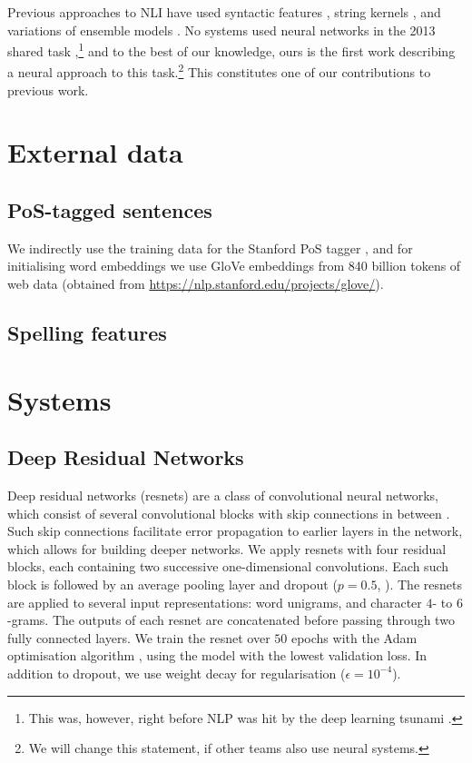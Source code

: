 \documentclass[11pt,letterpaper]{article}
\begin{document}
Previous approaches to NLI have used syntactic features \citep{bykh:2014}, string kernels \citep{ionescu:2014}, and variations of ensemble models \citep{malmasi:2017:nlisg,nli2013}.
No systems used neural networks in the 2013 shared task \citep{nli2013},\footnote{This was, however, right before NLP was hit by the deep learning tsunami \citep{manning:2016}.} and to the best of our knowledge, ours is the first work describing a neural approach to this task.\footnote{We will change this statement, if other teams also use neural systems.}
This constitutes one of our contributions to previous work.

\section{External data}
\subsection{PoS-tagged sentences}
We indirectly use the training data for the Stanford PoS tagger
\citep{Manning2014corenlp}, and for initialising word embeddings we use
GloVe embeddings from 840 billion tokens of web data (obtained from
\url{https://nlp.stanford.edu/projects/glove/}).

\subsection{Spelling features}

\section{Systems}
\subsection{Deep Residual Networks}

Deep residual networks (resnets) are a class of convolutional neural networks, which consist of several convolutional blocks with skip connections in between \citep{He2016identity}.
Such skip connections facilitate error propagation to earlier layers in the network, which allows for building deeper networks.
We apply resnets with four residual blocks, each containing two successive one-dimensional convolutions.
Each such block is followed by an average pooling layer and dropout ($p=0.5$, \citet{dropout}).
The resnets are applied to several input representations: word unigrams, and character $4$- to $6$-grams.
The outputs of each resnet are concatenated before passing through two fully connected layers.
We train the resnet over $50$ epochs with the Adam optimisation algorithm \citep{adam}, using the model with the lowest validation loss.
In addition to dropout, we use weight decay for regularisation ($\epsilon=10^{-4}$).
\end{document}
